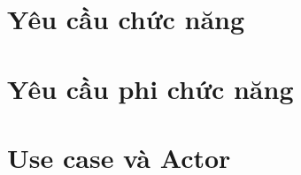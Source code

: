 \section{Yêu cầu chức năng}
\label{sec:yeu-cau-cn}

\section{Yêu cầu phi chức năng}
\label{sec:yeu-cau-pcn}

\section{Use case và Actor}
\label{sec:use-case}

